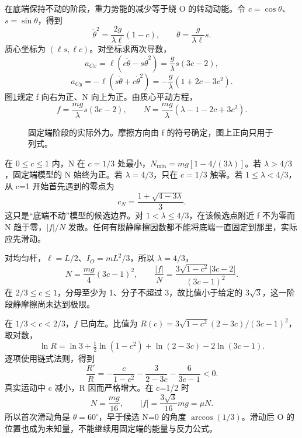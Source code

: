 \begin{solution}
在底端保持不动的阶段，重力势能的减少等于绕 O 的转动动能。令 $c=\cos\theta$、$s=\sin\theta$，得到
\[
\dot\theta^2=\frac{2g}{\lambda\ell}(1-c),\qquad
\ddot\theta=\frac g{\lambda\ell}s.
\]
质心坐标为 $(\ell s,\ell c)$。对坐标求两次导数，
\[
a_{Cx}=\ell(c\ddot\theta-s\dot\theta^2)
=\frac g\lambda s(3c-2),
\]
\[
a_{Cy}=-\ell(s\ddot\theta+c\dot\theta^2)
=-\frac g\lambda(1+2c-3c^2).
\]
图\ref{deep2:fig:d2-e6-s}规定 f 向右为正、N 向上为正。由质心平动方程，
\[
f=\frac{mg}{\lambda}s(3c-2),\qquad
N=\frac{mg}{\lambda}(\lambda-1-2c+3c^2).
\]

\begin{figure}[H]\centering
{}
\caption{固定端阶段的实际外力。摩擦方向由 f 的符号确定，图上正向只用于列式。}\label{deep2:fig:d2-e6-s}
\end{figure}

在 $0\le c\le1$ 内，N 在 $c=1/3$ 处最小，$N_{\min}=mg[1-4/(3\lambda)]$。若 $\lambda>4/3$，固定端模型的 N 始终为正。若 $\lambda=4/3$，只在 $c=1/3$ 触零。若 $1\le\lambda<4/3$，从 c=1 开始首先遇到的零点为
\[
c_N=\frac{1+\sqrt{4-3\lambda}}3.
\]
这只是“底端不动”模型的候选边界。对 $1<\lambda\le4/3$，在该候选点附近 f 不为零而 N 趋于零，$|f|/N$ 发散。任何有限静摩擦因数都不能将底端一直固定到那里，实际应先滑动。

对均匀杆，$\ell=L/2$、$I_O=mL^2/3$，所以 $\lambda=4/3$，
\[
N=\frac{mg}{4}(3c-1)^2,\qquad
\frac{|f|}{N}=\frac{3\sqrt{1-c^2}|3c-2|}{(3c-1)^2}.
\]
在 $2/3\le c\le1$，分母至少为 1、分子不超过 3，故比值小于给定的 $3\sqrt3$，这一阶段静摩擦尚未达到极限。

在 $1/3<c<2/3$，$f$ 已向左。比值为 $R(c)=3\sqrt{1-c^2}(2-3c)/(3c-1)^2$，取对数，
\[
\ln R=\ln3+\tfrac12\ln(1-c^2)+\ln(2-3c)-2\ln(3c-1).
\]
逐项使用链式法则，得到
\[
\frac{R'}R=-\frac c{1-c^2}-\frac3{2-3c}-\frac6{3c-1}<0.
\]
真实运动中 c 减小，R 因而严格增大。在 c=1/2 时
\[
N=\frac{mg}{16},\qquad |f|=\frac{3\sqrt3}{16}mg=\mu N.
\]
所以首次滑动角是 $\theta=60^\circ$，早于候选 N=0 的角度 $\arccos(1/3)$。滑动后 O 的位置也成为未知量，不能继续用固定端的能量与反力公式。

\end{solution}



